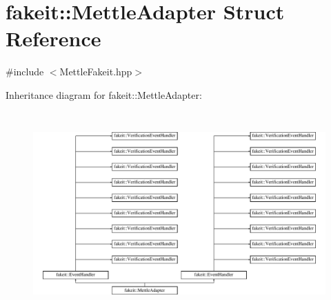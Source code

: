 \hypertarget{structfakeit_1_1MettleAdapter}{}\section{fakeit\+::Mettle\+Adapter Struct Reference}
\label{structfakeit_1_1MettleAdapter}


{\ttfamily \#include $<$Mettle\+Fakeit.\+hpp$>$}

Inheritance diagram for fakeit\+::Mettle\+Adapter\+:\begin{figure}[H]
\begin{center}
\leavevmode
\includegraphics[height=7.777778cm]{structfakeit_1_1MettleAdapter}
\end{center}
\end{figure}
